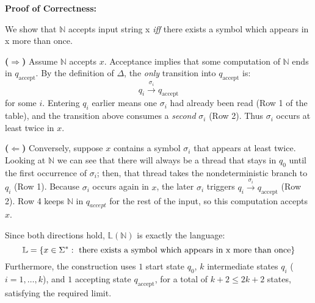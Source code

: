 \documentclass[12pt]{article}
\begin{document}
\begin{enumerate}[\bf P1.]
\vspace{1em}

\textbf{Proof of Correctness:}

We show that $\mathbb{N}$ accepts input string x \textit{iff} there exists a symbol which appears in x more than once.

\textbf{($\Rightarrow$)}
Assume $\mathbb{N}$ accepts $x$. Acceptance implies that some computation of $\mathbb{N}$ ends in $q_{\text{accept}}$. By the definition of $\Delta$, the \textit{only} transition into
$q_{\text{accept}}$ is:
\[
  q_i \xrightarrow{\sigma_i} q_{\text{accept}}
\]
for some $i$. Entering $q_i$ earlier means one $\sigma_i$ had already been read (Row 1 of the table), and the transition above consumes a \textit{second} $\sigma_i$ (Row 2). Thus $\sigma_i$ occurs at least twice in $x$.

\textbf{($\Leftarrow$)}
Conversely, suppose $x$ contains a symbol $\sigma_i$ that appears at least twice. Looking at $\mathbb{N}$ we can see that there will always be a thread that stays in $q_0$ until the first occurrence of $\sigma_i$; then, that thread takes the nondeterministic branch to $q_i$ (Row 1). Because $\sigma_i$ occurs again in $x$, the later $\sigma_i$ triggers $q_i\xrightarrow{\sigma_i}q_{\text{accept}}$ (Row 2). Row 4 keeps $\mathbb{N}$ in $q_{accept}$ for the rest of the input, so this computation accepts $x$.

\vspace{1em}

Since both directions hold, $\mathbb{L}(\mathbb{N})$ is exactly the language:
\[
\mathbb{L} = \{x \in \Sigma^* : \text{ there exists a symbol which appears in x more than once}\} \\
\]
Furthermore, the construction uses $1$ start state $q_0$, $k$ intermediate states $q_i$ ($i=1,\dots,k$),
and $1$ accepting state $q_{\text{accept}}$,
for a total of $k+2\le 2k+2$ states, satisfying the required limit.


\end{enumerate}
\end{document}
